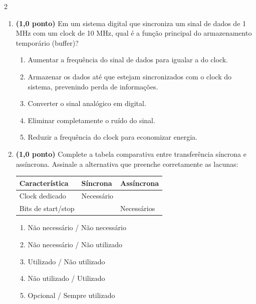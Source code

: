 \documentclass[a4paper,12pt]{article}
\begin{document}
\begin{multicols}{2}
\begin{enumerate}[leftmargin=*]
\vspace{0.2cm}


\item \textbf{(1,0 ponto)} Em um sistema digital que sincroniza um sinal de dados de 1 MHz com um clock de 10 MHz, qual é a função principal do armazenamento temporário (buffer)?

\begin{enumerate}[label=(\Alph*)]
    \item Aumentar a frequência do sinal de dados para igualar a do clock.
    \item Armazenar os dados até que estejam sincronizados com o clock do sistema, prevenindo perda de informações.
    \item Converter o sinal analógico em digital.
    \item Eliminar completamente o ruído do sinal.
    \item Reduzir a frequência do clock para economizar energia.
\end{enumerate}

\vspace{0.2cm}


\item \textbf{(1,0 ponto)} Complete a tabela comparativa entre transferência síncrona e assíncrona. Assinale a alternativa que preenche corretamente as lacunas:

\begin{tabular}{|l|l|l|}
\hline
\textbf{Característica} & \textbf{Síncrona} & \textbf{Assíncrona} \\
\hline
Clock dedicado & Necessário & \\
\hline
Bits de start/stop & & Necessários \\
\hline
\end{tabular}

\begin{enumerate}[label=(\Alph*)]
    \item Não necessário / Não necessário
    \item Não necessário / Não utilizado
    \item Utilizado / Não utilizado
    \item Não utilizado / Utilizado
    \item Opcional / Sempre utilizado
\end{enumerate}


\end{enumerate}
\end{multicols}
\end{document}
